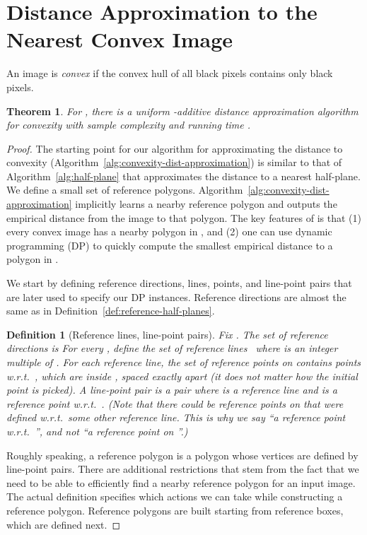 \documentclass[11pt,english]{article}
\newtheorem{theorem}{Theorem}[section]
\newtheorem{definition}{Definition}[section]
\numberwithin{figure}{section}
\begin{document}
\section{Distance Approximation to the Nearest Convex Image}\label{sec:convexity}
An image is \emph{convex} if the convex hull of all black pixels contains only black pixels.
\begin{theorem}\label{thm:convexity_dist_appr}
For , there is a uniform -additive distance approximation algorithm for convexity with sample complexity  and running time .
\end{theorem}
\begin{proof}
The starting point for our algorithm for approximating the distance to convexity (Algorithm~\ref{alg:convexity-dist-approximation}) is similar to that of Algorithm~\ref{alg:half-plane} that approximates the distance to a nearest half-plane. We define a small set  of reference polygons. Algorithm~\ref{alg:convexity-dist-approximation} implicitly learns a nearby reference polygon and outputs the empirical distance from the image to that polygon. The key features of  is that (1) every convex image has a nearby polygon in , and (2) one can use dynamic programming (DP) to quickly compute the smallest empirical distance to a polygon in .

We start by defining reference directions, lines, points, and line-point pairs that are later used to specify our DP instances.  Reference directions are almost the same as in Definition~\ref{def:reference-half-planes}.





\begin{definition}[Reference lines, line-point pairs]\label{def:reference-lines}
Fix .  The set of {\em reference directions} is 
For every , define the set of {\em reference lines} \ where  is an integer multiple of  .
For each reference line, the set of {\em reference points on } contains points w.r.t.\ , which are inside , spaced exactly   apart (it does not matter how the initial point is picked). A {\em line-point pair} is a pair  where  is a reference line and  is a reference point w.r.t.\ . (Note that there could be reference points on  that were defined w.r.t.\ some other reference line. This is why we say ``a reference point w.r.t.\ '', and not ``a reference point on ''.)
\end{definition}

Roughly speaking, a reference polygon is a polygon whose vertices are defined by line-point pairs. There are additional restrictions that stem from the fact that we need to be able to efficiently find a nearby reference polygon for an input image. The actual definition specifies which actions we can take while constructing a reference polygon. Reference polygons are built starting from reference boxes, which are defined next.


\end{proof}
\end{document}
